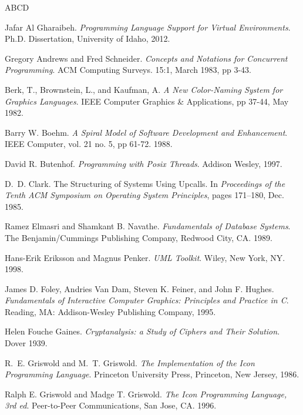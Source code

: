 \begin{thebibliography}{ABCD}

   Jafar Al Gharaibeh.  \emph{Programming Language Support
    for Virtual Environments}. Ph.D. Dissertation, University of Idaho, 2012.

   Gregory Andrews and Fred Schneider.
    \emph{Concepts and Notations for Concurrent Programming}.
    ACM Computing Surveys. 15:1, March 1983, pp 3-43.

   Berk, T., Brownstein, L., and Kaufman, A.
    \emph{A New Color-Naming System for Graphics Languages}.
    IEEE Computer Graphics \& Applications, pp 37-44, May 1982.

   Barry W. Boehm.
    \emph{A Spiral Model of Software Development and Enhancement}.
    IEEE Computer, vol. 21 no. 5, pp 61-72. 1988.

   David R. Butenhof.
    \emph{Programming with Posix Threads}. Addison Wesley, 1997.

 D.~D. Clark.
The {S}tructuring of {S}ystems {U}sing {U}pcalls.                     
In {\em Proceedings of the Tenth ACM Symposium on Operating System    
  Principles}, pages 171--180, Dec. 1985.

   Ramez Elmasri and Shamkant B. Navathe.
    \emph{Fundamentals of Database Systems}.
    The Benjamin/Cummings Publishing Company, Redwood City, CA. 1989.

   Hans-Erik Eriksson and Magnus Penker.
    \emph{UML Toolkit}. Wiley, New York, NY.  1998.

   James D. Foley, Andries Van Dam, Steven K. Feiner, and John
    F. Hughes.  \emph{Fundamentals of Interactive Computer Graphics: Principles
      and Practice in C}. Reading, MA: Addison-Wesley Publishing Company, 1995.

   Helen Fouche Gaines.
    \emph{Cryptanalysis: a Study of Ciphers and Their Solution}. Dover 1939.

 R.~E. Griswold and M.~T. Griswold.
{\em The Implementation of the Icon Programming Language}.            
Princeton University Press, Princeton, New Jersey, 1986.              

   Ralph E. Griswold and Madge T. Griswold.
    \emph{The Icon Programming Language, 3rd ed}. Peer-to-Peer Communications,
    San Jose, CA. 1996.


\end{thebibliography}
